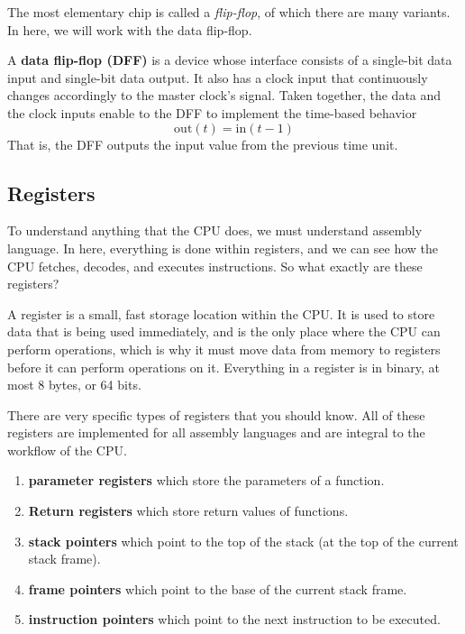   The most elementary chip is called a \textit{flip-flop}, of which there are many variants. In here, we will work with the data flip-flop. 

  \begin{definition}
    A \textbf{data flip-flop (DFF)} is a device whose interface consists of a single-bit data input and single-bit data output. It also has a clock input that continuously changes accordingly to the master clock's signal. Taken together, the data and the clock inputs enable to the DFF to implement the time-based behavior 
    \begin{equation}
      \mathrm{out}(t) = \mathrm{in}(t - 1) 
    \end{equation}
    That is, the DFF outputs the input value from the previous time unit. 
  \end{definition}

\subsection{Registers}

  To understand anything that the CPU does, we must understand assembly language. In here, everything is done within registers, and we can see how the CPU fetches, decodes, and executes instructions. So what exactly are these registers? 

  \begin{definition}[Register]
    A register is a small, fast storage location within the CPU. It is used to store data that is being used immediately, and is the only place where the CPU can perform operations, which is why it must move data from memory to registers before it can perform operations on it. Everything in a register is in binary, at most 8 bytes, or 64 bits. 

    There are very specific types of registers that you should know. All of these registers are implemented for all assembly languages and are integral to the workflow of the CPU.  
    \begin{enumerate}
      \item \textbf{parameter registers} which store the parameters of a function.
      \item \textbf{Return registers} which store return values of functions. 
      \item \textbf{stack pointers} which point to the top of the stack (at the top of the current stack frame). 
      \item \textbf{frame pointers} which point to the base of the current stack frame.
      \item \textbf{instruction pointers} which point to the next instruction to be executed.
    \end{enumerate}
  \end{definition}

